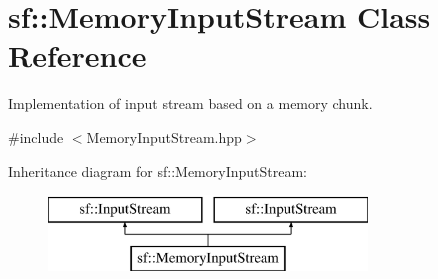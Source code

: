 \hypertarget{classsf_1_1_memory_input_stream}{\section{sf\-:\-:Memory\-Input\-Stream Class Reference}
\label{classsf_1_1_memory_input_stream}
}


Implementation of input stream based on a memory chunk.  




{\ttfamily \#include $<$Memory\-Input\-Stream.\-hpp$>$}

Inheritance diagram for sf\-:\-:Memory\-Input\-Stream\-:\begin{figure}[H]
\begin{center}
\leavevmode
\includegraphics[height=2.000000cm]{classsf_1_1_memory_input_stream}
\end{center}
\end{figure}
